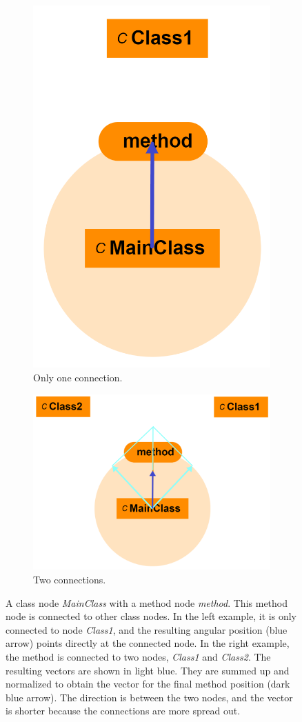 \documentclass[a4paper,11pt,twoside]{article}
\theoremstyle{definition} %
\begin{document}
\begin{figure}[h]
\centering
\begin{subfigure}{.5\textwidth}
  \centering
  \includegraphics[width=0.5\linewidth]{Subfigures/method_positioning_example1.PNG}
  \caption{Only one connection.}
  \label{fig:MethodPositioning1}
\end{subfigure}%
\begin{subfigure}{.5\textwidth}
  \centering
  \includegraphics[width=1.0\linewidth]{Subfigures/method_positioning_example2.PNG}
  \caption{Two connections.}
  \label{fig:MethodPositioning2}
\end{subfigure}
\caption{A class node \textit{MainClass} with a method node \textit{method}. This method node is connected to other class nodes. In the left example, it is only connected to node \textit{Class1}, and the resulting angular position (blue arrow) points directly at the connected node. In the right example, the method is connected to two nodes, \textit{Class1} and \textit{Class2}. The resulting vectors are shown in light blue. They are summed up and normalized to obtain the vector for the final method position (dark blue arrow). The direction is between the two nodes, and the vector is shorter because the connections are more spread out.}
\label{fig:MethodPositioning}
\end{figure}
\end{document}
